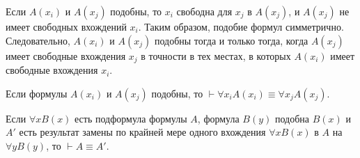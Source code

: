 Если $A(x_i)$ и $A(x_j)$ подобны, то $x_i$ свободна для $x_j$ в $A(x_j)$, и $A(x_j)$ не имеет свободных вхождений $x_i$. Таким образом, подобие формул симметрично. Следовательно, $A(x_i)$ и $A(x_j)$ подобны тогда и только тогда, когда $A(x_j)$ имеет свободные вхождения $x_j$ в точности в тех местах, в которых $A(x_i)$ имеет свободные вхождения $x_i$.
\begin{lemma}\label{th:var_rename}
    Если формулы $A(x_i)$ и $A(x_j)$ подобны, то $\vdash \forall x_iA(x_i) \equiv \forall x_jA(x_j)$.
\end{lemma}
\begin{corollary}
    Если $\forall xB(x)$ есть подформула формулы $A$, формула $B(y)$ подобна $B(x)$ и $A'$ есть результат замены по крайней мере одного вхождения $\forall xB(x)$ в $A$ на $\forall yB(y)$, то $\vdash A \equiv A'$.
\end{corollary}


